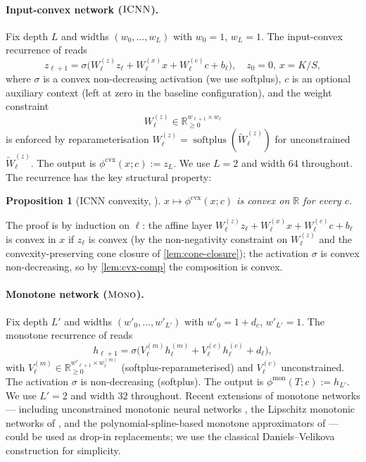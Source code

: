 \documentclass[largeformat]{interact}
\let\cite\citep   %
\theoremstyle{plain}
\newtheorem{proposition}[theorem]{Proposition}
\theoremstyle{definition}
\newcommand{\R}{\mathbb{R}}
\DeclareMathOperator{\softplus}{softplus}
\newcommand{\eqdef}{:=}
\newcommand{\icnn}{\textsc{ICNN}}
\newcommand{\mononet}{\textsc{Mono}}
\begin{document}
\paragraph{Input-convex network ($\icnn$).}
Fix depth $L$ and widths $(w_0, \dots, w_L)$ with $w_0 = 1$, $w_L = 1$. The input-convex recurrence of \citet{amos2017input} reads
\begin{equation}
\label{eq:icnn-recurrence}
z_{\ell+1} = \sigma\!\bigl( W^{(z)}_\ell z_\ell + W^{(x)}_\ell x + W^{(c)}_\ell c + b_\ell \bigr),
\quad z_0 = 0,\, x = K/S,
\end{equation}
where $\sigma$ is a convex non-decreasing activation (we use softplus), $c$ is an optional auxiliary context (left at zero in the baseline configuration), and the weight constraint
\begin{equation}
\label{eq:icnn-constraint}
W^{(z)}_\ell \in \R_{\geq 0}^{w_{\ell+1} \times w_\ell}
\end{equation}
is enforced by reparameterisation $W^{(z)}_\ell = \softplus(\widetilde W^{(z)}_\ell)$ for unconstrained $\widetilde W^{(z)}_\ell$. The output is $\phi^{\mathrm{cvx}}(x; c) \eqdef z_L$. We use $L = 2$ and width $64$ throughout. The recurrence has the key structural property:

\begin{proposition}[\icnn{} convexity, {\cite{amos2017input}}]
\label{prop:icnn-convexity}
$x \mapsto \phi^{\mathrm{cvx}}(x; c)$ is convex on $\R$ for every $c$.
\end{proposition}
The proof is by induction on $\ell$: the affine layer $W^{(z)}_\ell z_\ell + W^{(x)}_\ell x + W^{(c)}_\ell c + b_\ell$ is convex in $x$ if $z_\ell$ is convex (by the non-negativity constraint on $W^{(z)}_\ell$ and the convexity-preserving cone closure of \cref{lem:cone-closure}); the activation $\sigma$ is convex non-decreasing, so by \cref{lem:cvx-comp} the composition is convex.

\paragraph{Monotone network ($\mononet$).}
Fix depth $L'$ and widths $(w'_0, \dots, w'_{L'})$ with $w'_0 = 1 + d_c$, $w'_{L'} = 1$. The monotone recurrence of \citet{daniels2010monotone,sill1998monotonic} reads
\begin{equation}
\label{eq:mono-recurrence}
h_{\ell+1} = \sigma\!\bigl( V^{(m)}_\ell h^{(m)}_\ell + V^{(c)}_\ell h^{(c)}_\ell + d_\ell \bigr),
\end{equation}
with $V^{(m)}_\ell \in \R_{\geq 0}^{w'_{\ell+1} \times w^{(m)}_\ell}$ (softplus-reparameterised) and $V^{(c)}_\ell$ unconstrained. The activation $\sigma$ is non-decreasing (softplus). The output is $\phi^{\mathrm{mon}}(T; c) \eqdef h_{L'}$. We use $L' = 2$ and width $32$ throughout. Recent extensions of monotone networks --- including unconstrained monotonic neural networks \cite{wehenkel2019unconstrained}, the Lipschitz monotonic networks of \citet{runje2023constrained}, and the polynomial-spline-based monotone approximators of \citet{guo2021neural} --- could be used as drop-in replacements; we use the classical Daniels--Velikova construction for simplicity.
\end{document}
